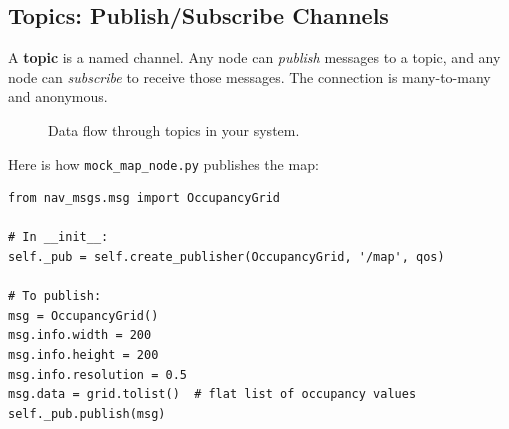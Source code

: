 \documentclass[12pt, a4paper]{article}
\begin{document}
\subsection{Topics: Publish/Subscribe Channels}
\label{sec:topics}

A \textbf{topic} is a named channel. Any node can \emph{publish} messages
to a topic, and any node can \emph{subscribe} to receive those messages.
The connection is many-to-many and anonymous.

\begin{figure}[h]
\centering
{}
\caption{Data flow through topics in your system.}
\label{fig:topics}
\end{figure}

Here is how \texttt{mock\_map\_node.py} publishes the map:

\begin{lstlisting}[style=python, caption={Publishing a message (mock\_map\_node.py, simplified)}]
from nav_msgs.msg import OccupancyGrid

# In __init__:
self._pub = self.create_publisher(OccupancyGrid, '/map', qos)

# To publish:
msg = OccupancyGrid()
msg.info.width = 200
msg.info.height = 200
msg.info.resolution = 0.5
msg.data = grid.tolist()  # flat list of occupancy values
self._pub.publish(msg)
\end{lstlisting}
\end{document}

